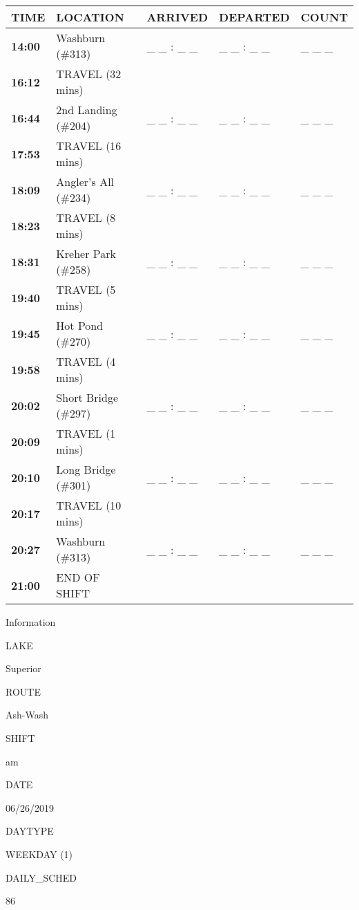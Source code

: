 \documentclass[]{article}
\begin{document}
\begin{tabular}{>{\bfseries}lllll}
\toprule
\textbf{TIME} & \textbf{LOCATION} & \textbf{ARRIVED} & \textbf{DEPARTED} & \textbf{COUNT}\\
\midrule
14:00 & Washburn (\#313) & \_ \_ : \_ \_ & \_ \_ : \_ \_ & \_ \_ \_\\
16:12 & TRAVEL (32 mins) &  &  & \\
16:44 & 2nd Landing (\#204) & \_ \_ : \_ \_ & \_ \_ : \_ \_ & \_ \_ \_\\
17:53 & TRAVEL (16 mins) &  &  & \\
18:09 & Angler's All (\#234) & \_ \_ : \_ \_ & \_ \_ : \_ \_ & \_ \_ \_\\
18:23 & TRAVEL (8 mins) &  &  & \\
18:31 & Kreher Park (\#258) & \_ \_ : \_ \_ & \_ \_ : \_ \_ & \_ \_ \_\\
19:40 & TRAVEL (5 mins) &  &  & \\
19:45 & Hot Pond (\#270) & \_ \_ : \_ \_ & \_ \_ : \_ \_ & \_ \_ \_\\
19:58 & TRAVEL (4 mins) &  &  & \\
20:02 & Short Bridge (\#297) & \_ \_ : \_ \_ & \_ \_ : \_ \_ & \_ \_ \_\\
20:09 & TRAVEL (1 mins) &  &  & \\
20:10 & Long Bridge (\#301) & \_ \_ : \_ \_ & \_ \_ : \_ \_ & \_ \_ \_\\
20:17 & TRAVEL (10 mins) &  &  & \\
20:27 & Washburn (\#313) & \_ \_ : \_ \_ & \_ \_ : \_ \_ & \_ \_ \_\\
21:00 & END OF SHIFT &  &  & \\
\bottomrule
\end{tabular}\newpage

Information

LAKE

Superior

ROUTE

Ash-Wash

SHIFT

am

DATE

06/26/2019

DAYTYPE

WEEKDAY (1)

DAILY\_SCHED

86

\vspace{24pt}
\end{document}
